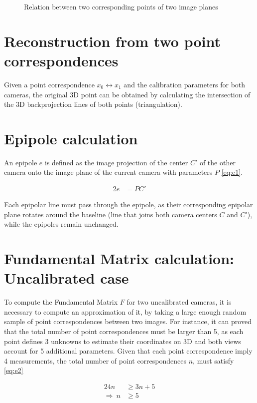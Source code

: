 \documentclass{article}
\begin{document}
\begin{figure}[!htbp]
\centering
{}
\caption{Relation between two corresponding points of two image planes}
\label{Fig:F1}
\end{figure}

\section{Reconstruction from two point correspondences}
Given a point correspondence $x_0 \leftrightarrow x_1$ and the calibration parameters for both cameras, the original 3D point can be obtained by calculating the intersection of the 3D backprojection lines of both points (triangulation).

\section{Epipole calculation}
An epipole $e$ is defined as the image projection of the center $C'$ of the other camera onto the image plane of the current camera with parameters $P$ \eqref{eq:e1}.

\begin{alignat}{2}
e &= PC' \label{eq:e1}
\end{alignat}   

Each epipolar line must pass through the epipole, as their corresponding epipolar plane rotates around the baseline (line that joins both camera centers $C$ and $C'$), while the epipoles remain unchanged.

\section{Fundamental Matrix calculation: Uncalibrated case}
To compute the Fundamental Matrix $F$ for two uncalibrated cameras, it is necessary to compute an approximation of it, by taking a large enough random sample of point correspondences between two images. For instance, it can proved that the total number of point correspondences must be larger than 5, as each point defines 3 unknowns to estimate their coordinates on 3D and both views account for 5 additional parameters. Given that each point correspondence imply 4 measurements, the total number of point correspondences $n$, must satisfy \eqref{eq:e2}

\begin{alignat}{2}
\nonumber
4n &\geq 3n + 5 \\
\Rightarrow ~ n &\geq 5 \label{eq:e2} 
\end{alignat}
\end{document}
